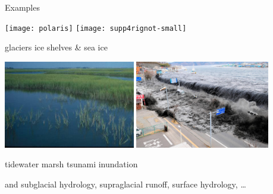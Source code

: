 \documentclass{beamer}
\begin{document}
\begin{frame}{Examples}

\texttt{[image: polaris]}
\hfill
\texttt{[image: supp4rignot-small]}

\small glaciers \hfill ice shelves \& sea ice

\medskip
\includegraphics[width=0.43\textwidth,keepaspectratio=true]{marsh-water}
\hfill
\includegraphics[width=0.44\textwidth,keepaspectratio=true]{tsunami-sendai}

\small tidewater marsh \hfill tsunami inundation


\medskip
\scriptsize and subglacial hydrology, supraglacial runoff, surface hydrology, \dots
\end{frame}
\end{document}

